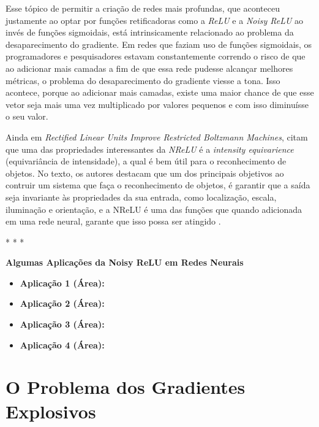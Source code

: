 Esse tópico de permitir a criação de redes mais profundas, que aconteceu justamente ao optar por funções retificadoras como a \textit{ReLU} e a \textit{Noisy ReLU} ao invés de funções sigmoidais, está intrinsicamente relacionado ao problema da desaparecimento do gradiente. Em redes que faziam uso de funções sigmoidais, os programadores e pesquisadores estavam constantemente correndo o risco de que ao adicionar mais camadas a fim de que essa rede pudesse alcançar melhores métricas, o problema do desaparecimento do gradiente viesse a tona. Isso acontece, porque ao adicionar mais camadas, existe uma maior chance de que esse vetor seja mais uma vez multiplicado por valores pequenos e com isso diminuísse o seu valor.

Ainda em \textit{Rectified Linear Units Improve Restricted Boltzmann Machines}, \textcite{Nair2010} citam que uma das propriedades interessantes da \textit{NReLU} é a \textit{intensity equivarience} (equivariância de intensidade), a qual é bem útil para o reconhecimento de objetos. No texto, os autores destacam que um dos principais objetivos ao contruir um sistema que faça o reconhecimento de objetos, é garantir que a saída seja invariante às propriedades da sua entrada, como localização, escala, iluminação e orientação, e a NReLU é uma das funções que quando adicionada em uma rede neural, garante que isso possa ser atingido \parencite{Nair2010}.

\medskip
\begin{center}
 * * *
\end{center}
\medskip

\textbf{Algumas Aplicações da Noisy ReLU em Redes Neurais}
\vspace{1em}

\begin{itemize}
    \item \textbf{Aplicação 1 (Área):}
    \item \textbf{Aplicação 2 (Área):}
    \item \textbf{Aplicação 3 (Área):}
    \item \textbf{Aplicação 4 (Área):}
\end{itemize}

\section{O Problema dos Gradientes Explosivos}

